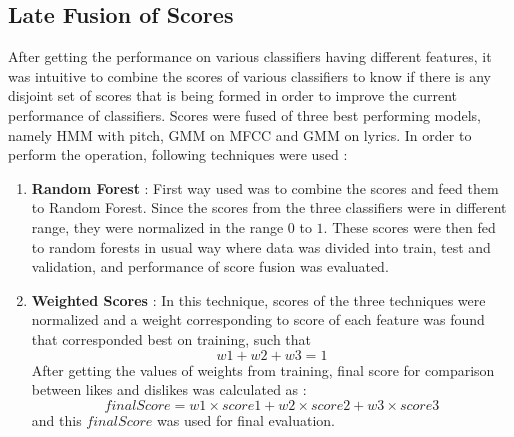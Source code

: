 \subsection{Late Fusion of Scores}
\label{sub:fusion}
After getting the performance on various classifiers having different features, it was intuitive to combine the scores of various classifiers to know if there is any disjoint set of scores that is being formed in order to improve the current performance of classifiers. Scores were fused of three best performing models, namely HMM with pitch, GMM on MFCC and GMM on lyrics. In order to perform the operation, following techniques were used :
\begin{enumerate}
\item \textbf{Random Forest} : First way used was to combine the scores and feed them to Random Forest. Since the scores from the three classifiers were in different range, they were normalized in the range $0$ to $1$. These scores were then fed to random forests in usual way where data was divided into train, test and validation, and performance of score fusion was evaluated.
      \item \textbf{Weighted Scores} : In this technique, scores of the three techniques were normalized and a weight corresponding to score of each feature was found that corresponded best on training, such that
      $$w1+w2+w3=1$$
      After getting the values of weights from training, final score for comparison between likes and dislikes was calculated as :
      $$finalScore=w1 \times score1+w2 \times score2+w3 \times score3$$
      and this $finalScore$ was used for final evaluation.
\end{enumerate}
